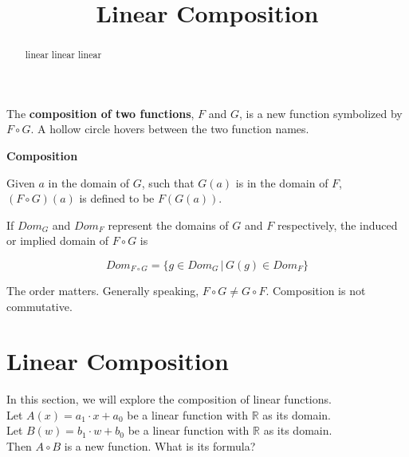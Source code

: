 \documentclass{ximera}
\title{Linear Composition}
\begin{document}
\begin{abstract}
linear linear linear
\end{abstract}
\maketitle


The \textbf{\textcolor{purple!85!blue}{composition of two functions}}, $F$ and $G$, is a new function symbolized by $F \circ G$. A hollow circle hovers between the two function names.


\begin{definition} \textbf{\textcolor{green!50!black}{Composition}} 


Given $a$ in the domain of $G$, such that $G(a)$ is in the domain of $F$, $(F \circ G)(a)$ is defined to be  $F(G(a))$.


If $Dom_G$ and $Dom_F$ represent the domains of $G$ and $F$ respectively, the induced or implied domain of $F \circ G$ is 




\[  Dom_{F \circ G} = \{  g \in  Dom_G  \,   |   \,   G(g) \in Dom_F                 \}           \]

\end{definition}

The order matters.  Generally speaking, $F \circ G \ne G \circ F$. Composition is not commutative.


















\section{Linear Composition}

In this section, we will explore the composition of linear functions. \\


Let $A(x) = a_1 \cdot x + a_0$ be a linear function with $\mathbb{R}$ as its domain. \\
Let $B(w) = b_1 \cdot w + b_0$ be a linear function with $\mathbb{R}$ as its domain. \\


Then $A \circ B$ is a new function. What is its formula? \\
\end{document}

